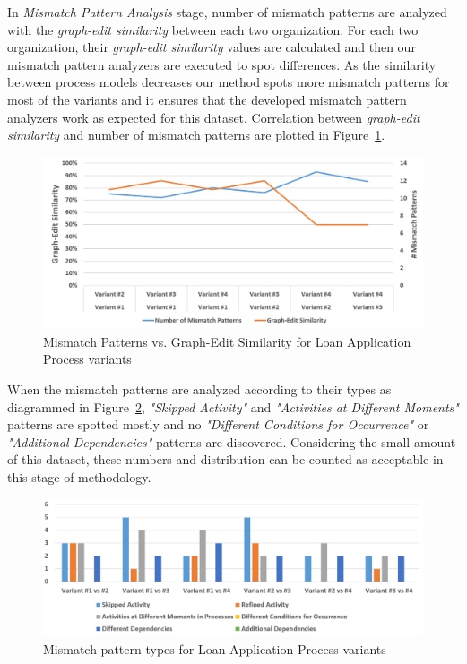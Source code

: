 In \textit{Mismatch Pattern Analysis} stage, number of mismatch patterns are analyzed with the \textit{graph-edit similarity} between each two organization. For each two organization, their \textit{graph-edit similarity} values are calculated and then our mismatch pattern analyzers are executed to spot differences. As the similarity between process models decreases our method spots more mismatch patterns for most of the variants and it ensures that the developed mismatch pattern analyzers work as expected for this dataset. Correlation between \textit{graph-edit similarity} and number of mismatch patterns are plotted in Figure~\ref{fig:loan-mismatch-pattern-analysis-results}.
\begin{figure}
	\centering
	\includegraphics[width=\textwidth]{5_results_discussions/loan-application-process/mismatch-pattern-analysis-results}
	\caption{Mismatch Patterns vs. Graph-Edit Similarity for Loan Application Process variants}
  \label{fig:loan-mismatch-pattern-analysis-results}
\end{figure}

When the mismatch patterns are analyzed according to their types as diagrammed in Figure~\ref{fig:loan-mismatch-pattern-types}, \textit{"Skipped Activity"} and \textit{"Activities at Different Moments"} patterns are spotted mostly and no \textit{"Different Conditions for Occurrence"} or \textit{"Additional Dependencies"} patterns are discovered. Considering the small amount of this dataset, these numbers and distribution can be counted as acceptable in this stage of methodology.
\begin{figure}
	\centering
	\includegraphics[width=\textwidth]{5_results_discussions/loan-application-process/mismatch-pattern-types}
	\caption{Mismatch pattern types for Loan Application Process variants}
  \label{fig:loan-mismatch-pattern-types}
\end{figure}
 
